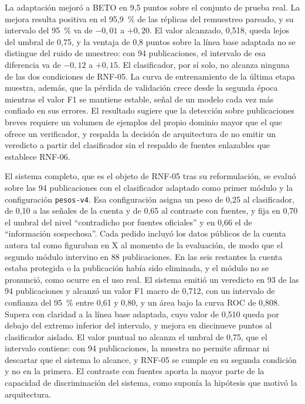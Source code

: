 La adaptación mejoró a BETO en 9,5 puntos sobre el conjunto de prueba real. La mejora resulta positiva en el 95,9~\% de las réplicas del remuestreo pareado, y su intervalo del 95~\% va de $-0{,}01$ a $+0{,}20$. El valor alcanzado, 0,518, queda lejos del umbral de 0,75, y la ventaja de 0,8 puntos sobre la línea base adaptada no se distingue del ruido de muestreo: con 94 publicaciones, el intervalo de esa diferencia va de $-0{,}12$ a $+0{,}15$. El clasificador, por sí solo, no alcanza ninguna de las dos condiciones de RNF-05. La curva de entrenamiento de la última etapa muestra, además, que la pérdida de validación crece desde la segunda época mientras el valor F1 se mantiene estable, señal de un modelo cada vez más confiado en sus errores. El resultado sugiere que la detección sobre publicaciones breves requiere un volumen de ejemplos del propio dominio mayor que el que ofrece un verificador, y respalda la decisión de arquitectura de no emitir un veredicto a partir del clasificador sin el respaldo de fuentes enlazables que establece RNF-06.

El sistema completo, que es el objeto de RNF-05 tras su reformulación, se evaluó sobre las 94 publicaciones con el clasificador adaptado como primer módulo y la configuración \texttt{pesos-v4}. Esa configuración asigna un peso de 0,25 al clasificador, de 0,10 a las señales de la cuenta y de 0,65 al contraste con fuentes, y fija en 0,70 el umbral del nivel \enquote{contradicho por fuentes oficiales} y en 0,66 el de \enquote{información sospechosa}. Cada pedido incluyó los datos públicos de la cuenta autora tal como figuraban en X al momento de la evaluación, de modo que el segundo módulo intervino en 88 publicaciones. En las seis restantes la cuenta estaba protegida o la publicación había sido eliminada, y el módulo no se pronunció, como ocurre en el uso real. El sistema emitió un veredicto en 93 de las 94 publicaciones y alcanzó un valor F1 macro de 0,712, con un intervalo de confianza del 95~\% entre 0,61 y 0,80, y un área bajo la curva ROC de 0,808. Supera con claridad a la línea base adaptada, cuyo valor de 0,510 queda por debajo del extremo inferior del intervalo, y mejora en diecinueve puntos al clasificador aislado. El valor puntual no alcanza el umbral de 0,75, que el intervalo contiene: con 94 publicaciones, la muestra no permite afirmar ni descartar que el sistema lo alcance, y RNF-05 se cumple en su segunda condición y no en la primera. El contraste con fuentes aporta la mayor parte de la capacidad de discriminación del sistema, como suponía la hipótesis que motivó la arquitectura.

